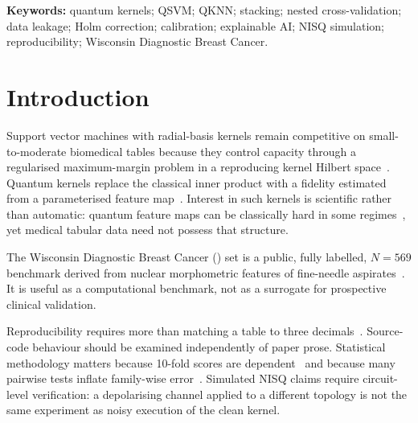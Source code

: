\documentclass[11pt,a4paper]{article}
\begin{document}
\begin{abstract}
\noindent\textbf{Conclusion.}
Under the audited \wdbc\ protocols, the non-VQC benchmark is independently reproducible, classical RBF remains strong, and the audited quantum stacking ensemble does not demonstrate superiority over classical RBF. Calibration is metric-dependent. Noisy simulation is not hardware validation. Parkinson's and Pima results, repaired full-scale VQC benchmarking, and physical NISQ execution are outside the present evidence.
\end{abstract}

\vspace{0.4em}
\noindent\textbf{Keywords:}
quantum kernels; QSVM; QKNN; stacking; nested cross-validation; data leakage; Holm correction; calibration; explainable AI; NISQ simulation; reproducibility; Wisconsin Diagnostic Breast Cancer.

\section{Introduction}
\label{sec:intro}

Support vector machines with radial-basis kernels remain competitive on small-to-moderate biomedical tables because they control capacity through a regularised maximum-margin problem in a reproducing kernel Hilbert space~\cite{cortes1995support,boser1992training,scholkopf2002learning}. Quantum kernels replace the classical inner product with a fidelity estimated from a parameterised feature map~\cite{havlicek2019quantum,schuld2019quantum,schuld2021supervised}. Interest in such kernels is scientific rather than automatic: quantum feature maps can be classically hard in some regimes~\cite{havlicek2019quantum,huang2021power}, yet medical tabular data need not possess that structure.

The Wisconsin Diagnostic Breast Cancer (\wdbc) set is a public, fully labelled, $N=569$ benchmark derived from nuclear morphometric features of fine-needle aspirates~\cite{street1993nuclear,mangasarian1995breast}. It is useful as a computational benchmark, not as a surrogate for prospective clinical validation.

Reproducibility requires more than matching a table to three decimals~\cite{pineau2021improving,kapoor2023leakage}. Source-code behaviour should be examined independently of paper prose. Statistical methodology matters because 10-fold scores are dependent~\cite{dietterich1998approximate,nadeau2003inference} and because many pairwise tests inflate family-wise error~\cite{holm1979simple}. Simulated NISQ claims require circuit-level verification: a depolarising channel applied to a different topology is not the same experiment as noisy execution of the clean kernel.
\end{document}

